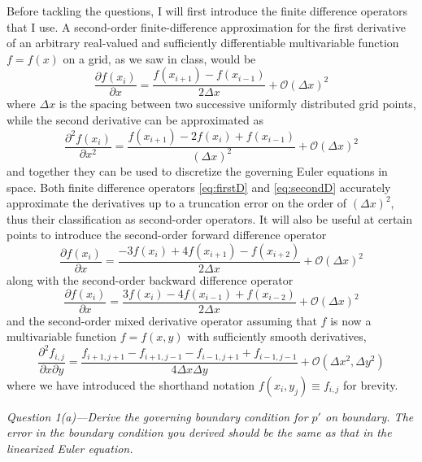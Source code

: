 \documentclass[11pt]{article}
\begin{document}
Before tackling the questions, I will first introduce the finite difference operators that I use. A second-order finite-difference approximation for the first derivative of an arbitrary real-valued and sufficiently differentiable multivariable function $f = f(x)$ on a grid, as we saw in class, would be 
\begin{equation} \label{eq:firstD}
\frac{\partial f(x_i)}{\partial x} = \frac{f(x_{i+1}) - f(x_{i-1})}{2\Delta x} + \mathcal{O}(\Delta x)^2
\end{equation}
where $\Delta x$ is the spacing between two successive uniformly distributed grid points, while the second derivative can be approximated as
\begin{equation} \label{eq:secondD}
\frac{\partial^2 f(x_i)}{\partial x^2} = \frac{f(x_{i+1}) - 2f(x_i) + f(x_{i-1})}{(\Delta x)^2} + \mathcal{O}(\Delta x)^2
\end{equation}
and together they can be used to discretize the governing Euler equations in space. Both finite difference operators \eqref{eq:firstD} and \eqref{eq:secondD} accurately approximate the derivatives up to a truncation error on the order of $(\Delta x)^2$, thus their classification as second-order operators. It will also be useful at certain points to introduce the second-order forward difference operator
\begin{equation} \label{eq:firstDforward}
\frac{\partial f(x_i)}{\partial x} = \frac{-3f(x_{i}) + 4f(x_{i+1}) - f(x_{i+2})}{2\Delta x} + \mathcal{O}(\Delta x)^2
\end{equation}
along with the second-order backward difference operator
\begin{equation} \label{eq:firstDbackward}
\frac{\partial f(x_i)}{\partial x} = \frac{3f(x_{i}) - 4f(x_{i-1}) + f(x_{i-2})}{2\Delta x} + \mathcal{O}(\Delta x)^2
\end{equation}
and the second-order mixed derivative operator assuming that $f$ is now a multivariable function $f = f(x,y)$ with sufficiently smooth derivatives,
\begin{equation}
\frac{\partial^2 f_{i,j}}{\partial x \partial y} = \frac{f_{i+1,j+1} - f_{i+1,j-1} - f_{i-1,j+1} + f_{i-1,j-1}}{4\Delta x \Delta y} + \mathcal{O}(\Delta x^2, \Delta y^2)
\end{equation}
where we have introduced the shorthand notation $f(x_i,y_j) \equiv f_{i,j}$ for brevity.

\begin{tcolorbox}
  \textit{Question 1(a)---Derive the governing boundary condition for $p'$ on boundary. The error in the boundary condition you derived should be the same as that in the linearized Euler equation.}
\end{tcolorbox}
\end{document}
